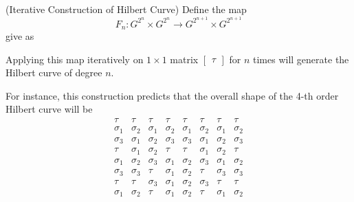 \documentclass[12pt]{article}
\begin{document}
\begin{construction}(Iterative Construction of Hilbert Curve)
	Define the map 
	\[  F_n : G^{2^n}\times G^{2^n} \to G^{2^{n+1}}\times G^{2^{n+1}}  \]
	give as 
	
	\FloatBarrier
	Applying this map iteratively on $ 1\times 1 $ matrix $ \begin{bmatrix}  \tau  \end{bmatrix} $ for $ n $ times will generate the Hilbert curve of degree $ n $. 
\end{construction}
For instance, this construction predicts that the overall shape of the 4-th order Hilbert curve will be
\[ 
\boxed{\begin{array}{cccccccc}
	\tau & \tau & \tau & \tau & \tau & \tau & \tau & \tau \\
	\sigma_1 & \sigma_2 & \sigma_1 & \sigma_2 & \sigma_1 & \sigma_2 & \sigma_1 & \sigma_2 \\
	\sigma_3 & \sigma_1 & \sigma_2 & \sigma_3 & \sigma_3 & \sigma_1 & \sigma_2 & \sigma_3 \\
	\tau & \sigma_1 & \sigma_2 & \tau & \tau & \sigma_1 & \sigma_2 & \tau \\
	\sigma_1 & \sigma_2 & \sigma_3 & \sigma_1 & \sigma_2 & \sigma_3 & \sigma_1 & \sigma_2 \\
	\sigma_3 & \sigma_3 & \tau & \sigma_1 & \sigma_2 & \tau & \sigma_3 & \sigma_3 \\
	\tau & \tau & \sigma_3 & \sigma_1 & \sigma_2 & \sigma_3 & \tau & \tau \\
	\sigma_1 & \sigma_2 & \tau & \sigma_1 & \sigma_2 & \tau & \sigma_1 & \sigma_2
\end{array}}
\]
\end{document}
